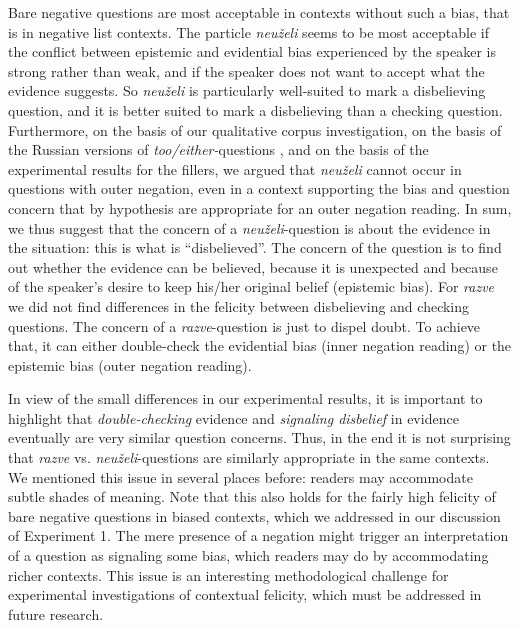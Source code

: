 \documentclass[output=paper,colorlinks,citecolor=brown]{langscibook}
\begin{document}
Bare negative questions are most acceptable in contexts without such a bias, that is in negative list contexts. The particle \textit{neuželi} seems to be most acceptable if the conflict between epistemic and evidential bias experienced by the speaker is strong rather than weak, and if the speaker does not want to accept what the evidence suggests. So \textit{neuželi} is particularly well-suited to mark a disbelieving question, and it is better suited to mark a disbelieving than a checking question. Furthermore, on the basis of our qualitative corpus investigation, on the basis of the Russian versions of \textit{too/either-}questions , and on the basis of the experimental results for the fillers, we argued that \textit{neuželi} cannot occur in questions with outer negation, even in a context supporting the bias and question concern that by hypothesis are appropriate for an outer negation reading. In sum, we thus suggest that the concern of a \textit{neuželi}-question is about the evidence in the situation: this is what is ``disbelieved''. The concern of the question is to find out whether the evidence can be believed, because it is unexpected and because of the speaker's desire to keep his/her original belief (epistemic bias). For \textit{razve} we did not find differences in the felicity between disbelieving and checking questions. The concern of a \textit{razve}-question is just to dispel doubt. To achieve that, it can either double-check the evidential bias (inner negation reading) or the epistemic bias (outer negation reading).

In view of the small differences in our experimental results, it is important to highlight that \textit{double-checking} evidence and \textit{signaling disbelief} in evidence eventually are very similar question concerns. Thus, in the end it is not surprising that \textit{razve} vs. \textit{neuželi}-questions are similarly appropriate in the same contexts. We mentioned this issue in several places before: readers may accommodate subtle shades of meaning. Note that this also holds for the fairly high felicity of bare negative questions in biased contexts, which we addressed in our discussion of Experiment 1. The mere presence of a negation might trigger an interpretation of a question as signaling some bias, which readers may do by accommodating richer contexts. This issue is an interesting methodological challenge for experimental investigations of contextual felicity, which must be addressed in future research.
\end{document}
